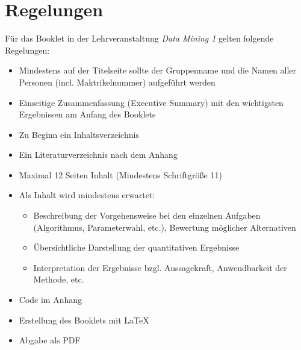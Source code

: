 \section*{Regelungen}
	Für das Booklet in der Lehrveranstaltung \textit{Data Mining 1} gelten folgende Regelungen:
	\begin{itemize}
		\item Mindestens auf der Titelseite sollte der Gruppenname und die Namen aller Personen (incl. Maktrikelnummer) aufgeführt werden
		\item Einseitige Zusammenfassung (Executive Summary) mit den wichtigsten Ergebnissen am Anfang des Booklets
		\item Zu Beginn ein Inhaltsverzeichnis
		\item Ein Literaturverzeichnis nach dem Anhang
		\item Maximal 12 Seiten Inhalt (Mindestens Schriftgröße 11)
		\item Als Inhalt wird mindestens erwartet:
		\begin{itemize}[$\Rightarrow$]
			\item Beschreibung der Vorgehensweise bei den einzelnen Aufgaben (Algorithmus, Parameterwahl, etc.), Bewertung möglicher Alternativen
			\item Übersichtliche Darstellung der quantitativen Ergebnisse
			\item Interpretation der Ergebnisse bzgl. Aussagekraft, Anwendbarkeit der Methode, etc.
		\end{itemize}
		\item Code im Anhang
		\item Erstellung des Booklets mit \LaTeX
		\item Abgabe als PDF
	\end{itemize}
